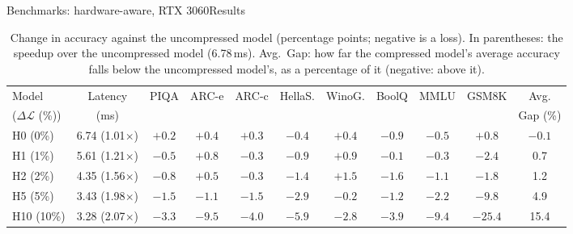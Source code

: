 \documentclass[aspectratio=169,10pt]{beamer}
\newcommand{\dloss}{\Delta\mathcal{L}}
\begin{document}
\begin{frame}{Benchmarks: hardware-aware, RTX 3060}{Results}
\begin{table}
\centering
\begin{adjustbox}{width=\linewidth, totalheight=0.64\textheight, keepaspectratio, center}
\centering
\small
\setlength{\tabcolsep}{3pt}
\begin{tabular}{lcccccccccc}
\toprule
Model & Latency & PIQA & ARC-e & ARC-c & HellaS. & WinoG. & BoolQ & MMLU & GSM8K & Avg. \\
($\dloss$ (\%)) & (ms)   &      &       &       &         &        &       &      &       & Gap (\%) \\
\midrule
H0  (0\%)  & 6.74 (1.01$\times$) & $+0.2$ & $+0.4$ & $+0.3$ & $-0.4$ & $+0.4$ & $-0.9$ & $-0.5$ & $+0.8$  & $-0.1$ \\
H1  (1\%)  & 5.61 (1.21$\times$) & $-0.5$ & $+0.8$ & $-0.3$ & $-0.9$ & $+0.9$ & $-0.1$ & $-0.3$ & $-2.4$  & 0.7 \\
H2  (2\%)  & 4.35 (1.56$\times$) & $-0.8$ & $+0.5$ & $-0.3$ & $-1.4$ & $+1.5$ & $-1.6$ & $-1.1$ & $-1.8$  & 1.2 \\
H5  (5\%)  & 3.43 (1.98$\times$) & $-1.5$ & $-1.1$ & $-1.5$ & $-2.9$ & $-0.2$ & $-1.2$ & $-2.2$ & $-9.8$  & 4.9 \\
H10 (10\%) & 3.28 (2.07$\times$) & $-3.3$ & $-9.5$ & $-4.0$ & $-5.9$ & $-2.8$ & $-3.9$ & $-9.4$ & $-25.4$ & 15.4 \\
\bottomrule
\end{tabular}
\end{adjustbox}
\caption{Change in accuracy against the uncompressed model (percentage points; negative is a loss). In parentheses: the speedup over the uncompressed model (6.78\,ms). Avg.\ Gap: how far the compressed model's average accuracy falls below the uncompressed model's, as a percentage of it (negative: above it).}\label{tab:hwdelta}
\end{table}
\end{frame}
\end{document}
